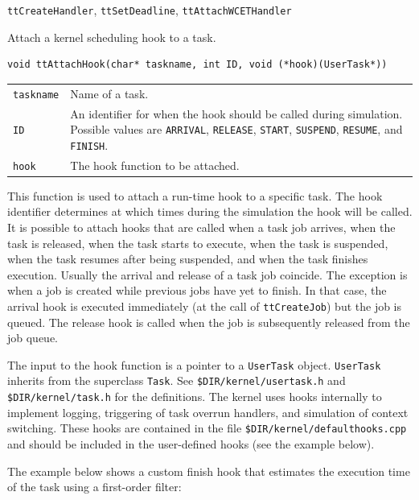 \documentclass[final,twoside]{rapport}
\begin{document}
\seealso 
{\tt ttCreateHandler}, {\tt ttSetDeadline}, {\tt ttAttachWCETHandler}




\purpose
Attach a kernel scheduling hook to a task.

\Csyntax
\begin{verbatim}
void ttAttachHook(char* taskname, int ID, void (*hook)(UserTask*))
\end{verbatim}

\args
\begin{tabularx}{\hsize}{l>{\raggedright\arraybackslash}X}
  {\tt taskname} & Name of a task. \\
  {\tt ID} & An identifier for when the hook should be called
  during simulation. Possible values are \texttt{ARRIVAL}, \texttt{RELEASE},
  \texttt{START}, \texttt{SUSPEND}, \texttt{RESUME}, and \texttt{FINISH}. \\
  {\tt hook} & The hook function to be attached.
\end{tabularx}

\descr This function is used to attach a run-time hook to a specific
task. The hook identifier determines at which times during the
simulation the hook will be called. It is possible to attach hooks
that are called when a task job arrives, when the task is released,
when the task starts to execute, when the task is suspended, when the
task resumes after being suspended, and when the task finishes
execution. Usually the arrival and release of a task job coincide.
The exception is when a job is created while previous jobs have yet to
finish. In that case, the arrival hook is executed immediately (at the
call of {\tt ttCreateJob}) but the job is queued. The release hook is
called when the job is subsequently released from the job queue.
 
The input to the hook function is a pointer to a \texttt{UserTask}
object. \texttt{UserTask} inherits from the superclass \texttt{Task}.
See \texttt{\$DIR/kernel/usertask.h} and \texttt{\$DIR/kernel/task.h}
for the definitions. The kernel uses hooks internally to implement
logging, triggering of task overrun handlers, and simulation of
context switching. These hooks are contained in the file
\texttt{\$DIR/kernel/defaulthooks.cpp} and should be included in the
user-defined hooks (see the example below).

\example The example below shows a custom finish hook that estimates
the execution time of the task using a first-order filter:
\end{document}
